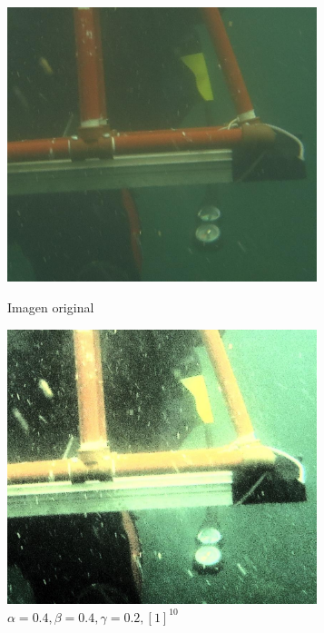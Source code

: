 \begin{figure}[H]
\begin{minipage}[c]{0.48\linewidth}
  \includegraphics[height=8cm]{imgs/1907xx.pdf}
  \caption{Imagen original}
\end{minipage}
\hfill
\begin{minipage}[c]{0.48\linewidth}
  \includegraphics[height=8cm]{imgs/1907xxOut.pdf}
    \caption{$\alpha = 0.4, \beta = 0.4, \gamma = 0.2, [1]^{10}$}
\end{minipage}%
\end{figure}
